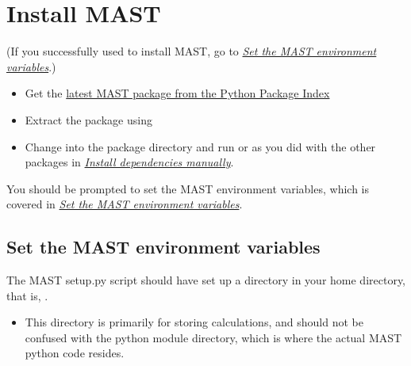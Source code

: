 \documentclass[letterpaper,10pt,english]{sphinxmanual}
\begin{document}
\section{Install MAST}
\label{1_0_installation:id2}\label{1_0_installation:install-mast}
(If you successfully used  to install MAST, go to {\hyperref[1_0_installation:mast-setup]{\emph{Set the MAST environment variables}}}.)
\begin{itemize}
\item {} 
Get the \href{https://pypi.python.org/pypi/MAST}{latest MAST package from the Python Package Index}

\item {} 
Extract the package using 

\item {} 
Change into the package directory and run  or  as you did with the other packages in {\hyperref[1_0_installation:manual-installation]{\emph{Install dependencies manually}}}.

\end{itemize}

You should be prompted to set the MAST environment variables, which is covered in {\hyperref[1_0_installation:mast-setup]{\emph{Set the MAST environment variables}}}.


\subsection{Set the MAST environment variables}
\label{1_0_installation:mast-setup}\label{1_0_installation:set-the-mast-environment-variables}
The MAST setup.py script should have set up a  directory in your home directory, that is, .
\begin{itemize}
\item {} 
This directory is primarily for storing calculations, and should not be confused with the python module directory, which is where the actual MAST python code resides.

\end{itemize}
\end{document}
